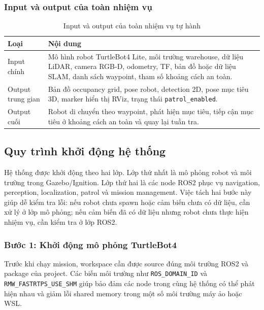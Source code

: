 \subsubsection{Input và output của toàn nhiệm vụ}
\label{subsubsec:mission-io}

\begin{table}[H]
    \centering
    \caption{Input và output của toàn nhiệm vụ tự hành}
    \label{tab:mission-io}
    \renewcommand{\arraystretch}{1.25}
    \small
    \begin{tabularx}{\textwidth}{|>{\raggedright\arraybackslash}p{}|>{\raggedright\arraybackslash}X|}
        \hline
        \textbf{Loại} & \textbf{Nội dung} \\
        \hline
        Input chính & Mô hình robot TurtleBot4 Lite, môi trường warehouse, dữ liệu LiDAR, camera RGB-D, odometry, TF, bản đồ hoặc dữ liệu SLAM, danh sách waypoint, tham số khoảng cách an toàn. \\
        \hline
        Output trung gian & Bản đồ occupancy grid, pose robot, detection 2D, pose mục tiêu 3D, marker hiển thị RViz, trạng thái \texttt{patrol\_enabled}. \\
        \hline
        Output cuối & Robot di chuyển theo waypoint, phát hiện mục tiêu, tiếp cận mục tiêu ở khoảng cách an toàn và quay lại tuần tra. \\
        \hline
    \end{tabularx}
\end{table}

\subsection{Quy trình khởi động hệ thống}
\label{subsec:system-startup}

Hệ thống được khởi động theo hai lớp. Lớp thứ nhất là mô phỏng robot và môi trường trong Gazebo/Ignition. Lớp thứ hai là các node ROS2 phục vụ navigation, perception, localization, patrol và mission management. Việc tách hai bước này giúp dễ kiểm tra lỗi: nếu robot chưa spawn hoặc cảm biến chưa có dữ liệu, cần xử lý ở lớp mô phỏng; nếu cảm biến đã có dữ liệu nhưng robot chưa thực hiện nhiệm vụ, cần kiểm tra ở lớp ROS2.

\subsubsection{Bước 1: Khởi động mô phỏng TurtleBot4}
\label{subsubsec:start-simulation}

Trước khi chạy mission, workspace cần được source đúng môi trường ROS2 và package của project. Các biến môi trường như \texttt{ROS\_DOMAIN\_ID} và \texttt{RMW\_FASTRTPS\_USE\_SHM} giúp bảo đảm các node trong cùng hệ thống có thể phát hiện nhau và giảm lỗi shared memory trong một số môi trường máy ảo hoặc WSL.

